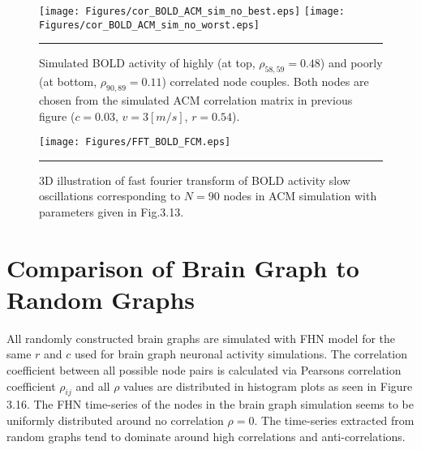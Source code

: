 \begin{figure}[htbp]
 
  \centering
	 \texttt{[image: Figures/cor\_BOLD\_ACM\_sim\_no\_best.eps]} 
   	 \texttt{[image: Figures/cor\_BOLD\_ACM\_sim\_no\_worst.eps]} 

    \rule{35em}{0.5pt}
  \caption[BOLD Activity Node Dynamics, ACM]{Simulated BOLD activity of highly (at top, $\rho_{58,59}=0.48$) and poorly (at bottom, $\rho_{90,89}=0.11$) correlated node couples. Both nodes are chosen from the simulated ACM correlation matrix in previous figure ($c=0.03$, $v=3 [m/s]$, $r=0.54$).} 
    \label{fig:BOLD Activity Node Dynamics, ACM}
 	
\end{figure} 






\begin{figure}[htbp]
 
  \centering
	 \texttt{[image: Figures/FFT\_BOLD\_FCM.eps]} 

    \rule{35em}{0.5pt}
  \caption[3D Fast Fourier Transform, BOLD, ACM]{3D illustration of fast fourier transform of BOLD activity slow oscillations corresponding to $N=90$ nodes in ACM simulation with parameters given in Fig.3.13.} 
    \label{fig:3D Fast Fourier Transform, BOLD, ACM}
 	
\end{figure}  

\clearpage

\section{Comparison of Brain Graph to Random Graphs}


All randomly constructed brain graphs are simulated with FHN model for the same $r$ and $c$ used for brain graph neuronal activity simulations. The correlation coefficient between all possible node pairs is calculated via Pearsons correlation coefficient $\rho_{ij}$ and all $\rho$ values are distributed in histogram plots as seen in Figure 3.16. The FHN time-series of the nodes in the brain graph simulation seems to be uniformly distributed around no correlation $\rho=0$. The time-series extracted from random graphs tend to dominate around high correlations and anti-correlations. 



